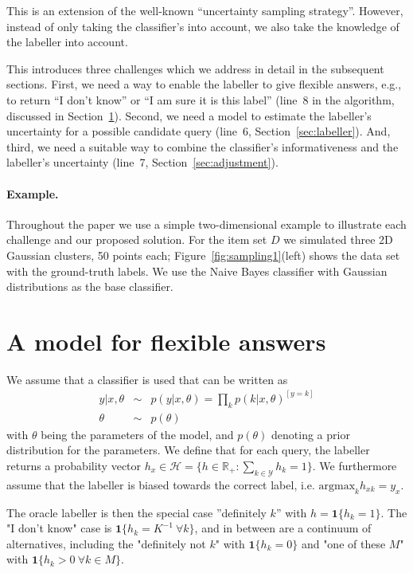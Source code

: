 \documentclass[10pt, onecolumn]{article}
\newcommand{\answer}{h}
\renewcommand{\H}{\mathcal{H}}
\newcommand{\R}{\mathbb{R}}
\newcommand{\C}{\mathcal{Y}}
\begin{document}
This is an extension of the well-known ``uncertainty sampling
strategy''. However, instead of only taking the classifier's into
account, we also take the knowledge of the labeller into account.

This introduces three challenges which we address in detail in the
subsequent sections. First, we need a way to enable the labeller to
give flexible answers, e.g., to return ``I don't know'' or ``I am sure
it is this label'' (line~8 in the algorithm, discussed in
Section~\ref{sec:answers}). Second, we need a model to estimate the
labeller's uncertainty for a possible candidate query (line~6,
Section~\ref{sec:labeller}). And, third, we need a suitable way to
combine the classifier's informativeness and the labeller's
uncertainty (line~7, Section~\ref{sec:adjustment}).


\paragraph{Example.} Throughout the paper we use a simple
two-dimensional example to illustrate each challenge and our proposed
solution. For the item set $D$ we simulated three 2D Gaussian
clusters, 50 points each; Figure~\ref{fig:sampling1}(left) shows the
data set with the ground-truth labels. We use the Naive Bayes
classifier with Gaussian distributions as the base classifier.



\section{A model for flexible answers}
\label{sec:answers}

We assume that a classifier is used that can be written as
\begin{eqnarray}
y | x, \theta &\sim & p(y| x, \theta)=\prod_k p(k|x,\theta)^{[y=k]}\\
\theta & \sim & p(\theta)
\end{eqnarray}
with $\theta$ being the parameters of the model, and $p(\theta)$
denoting a prior distribution for the parameters. We define that for
each query, the labeller returns a probability vector $\answer_x \in
\H=\{h\in \R_+: \sum_{k\in \C} h_k=1\}$. We furthermore assume that
the labeller is biased towards the correct label,
i.e. $\mathrm{argmax}_k h_{xk}=y_x$.

The oracle labeller is then the special case ''definitely $k$'' with
$h=\mathbf{1}\{h_k=1\}$. The "I don't know" case is $\mathbf{1}\{
h_k=K^{-1}\ \forall k\}$, and in between are a continuum of
alternatives, including the "definitely not $k$" with
$\mathbf{1}\{h_k=0\}$ and "one of these $M$" with $\mathbf{1}\{h_k>0\
\forall k\in M\}$. 
\end{document}
